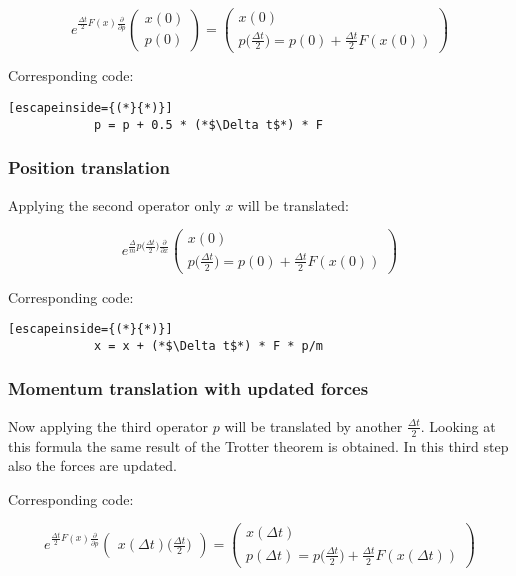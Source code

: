 		$$e^{\frac{\Delta t}{2}F(x)\frac{\partial}{\partial p}}\begin{pmatrix}x(0)\\p(0)\end{pmatrix} = \begin{pmatrix} x(0)\\ p\biggl(\frac{\Delta t}{2}\biggr) = p(0) + \frac{\Delta t}{2}F(x(0))\end{pmatrix}$$

		Corresponding code:

		\begin{lstlisting}[escapeinside={(*}{*)}]
			p = p + 0.5 * (*$\Delta t$*) * F
		\end{lstlisting}

		\subsubsection{Position translation}
		Applying the second operator only $x$ will be translated:

		$$e^{\frac{\Delta}{m}p\biggl(\frac{\Delta t}{2}\biggr)\frac{\partial}{\partial x}}\begin{pmatrix}x(0)\\p\biggl(\frac{\Delta t}{2}\biggr) = p(0) + \frac{\Delta t}{2}F(x(0))\end{pmatrix}$$

		Corresponding code:

		\begin{lstlisting}[escapeinside={(*}{*)}]
			x = x + (*$\Delta t$*) * F * p/m
		\end{lstlisting}

		\subsubsection{Momentum translation with updated forces}
		Now applying the third operator $p$ will be translated by another $\frac{\Delta t}{2}$.
		Looking at this formula the same result of the Trotter theorem is obtained.
		In this third step also the forces are updated.

		Corresponding code:

		$$e^{\frac{\Delta t}{2}F(x)\frac{\partial}{\partial p}}\begin{pmatrix}x(\Delta t)\biggl(\frac{\Delta t}{2}\biggr)\end{pmatrix} = \begin{pmatrix} x(\Delta t) \\ p(\Delta t) = p\biggl(\frac{\Delta t}{2}\biggr) + \frac{\Delta t}{2}F(x(\Delta t))\end{pmatrix}$$

